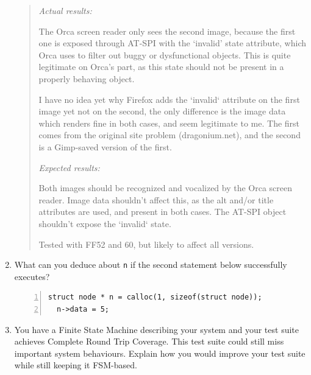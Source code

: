 \documentclass[12pt]{article}
\begin{document}
\begin{enumerate}[label=(\alph*)]
\begin{quote}
\emph{Actual results:}

The Orca screen reader only sees the second image, because the first one is exposed through AT-SPI with the `invalid' state attribute, which Orca uses to filter out buggy or dysfunctional objects.  This is quite legitimate on Orca's part, as this state should not be present in a properly behaving object.

I have no idea yet why Firefox adds the `invalid` attribute on the first image yet not on the second, the only difference is the image data which renders fine in both cases, and seem legitimate to me.  The first comes from the original site problem (dragonium.net), and the second is a Gimp-saved version of the first.

\emph{Expected results:}

Both images should be recognized and vocalized by the Orca screen
reader. Image data shouldn't affect this, as the alt and/or title
attributes are used, and present in both cases.  The AT-SPI object
shouldn't expose the `invalid` state.

Tested with FF52 and 60, but likely to affect all versions.
\end{quote}

\vspace*{8em}

\item What can you deduce about {\tt n} if the second statement below successfully executes?
\begin{lstlisting}[numbers=left]
  struct node * n = calloc(1, sizeof(struct node));
  n->data = 5;
\end{lstlisting}
\vspace*{8em}

\newpage
\item You have a Finite State Machine describing your system and your test suite achieves Complete Round Trip Coverage.
This test suite could still miss important system behaviours. Explain how you would improve your test suite
while still keeping it FSM-based.
\vspace*{6em}
\end{enumerate}
\end{document}
